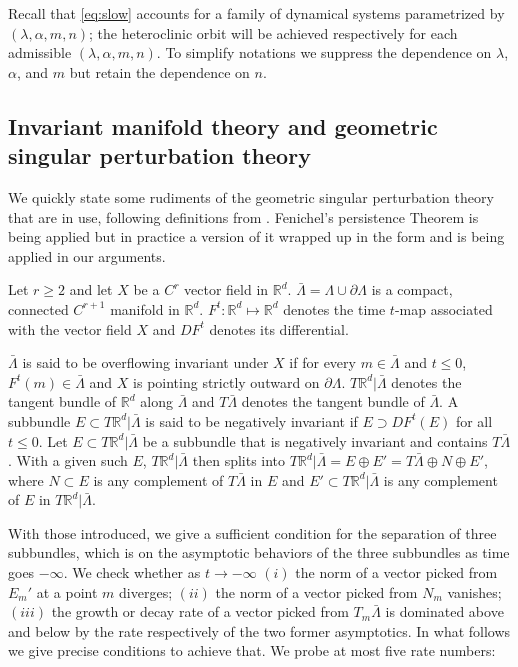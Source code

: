 \documentclass[usletter,11pt]{article}
\theoremstyle{remark}
\begin{document}
Recall that \eqref{eq:slow} accounts for a family of dynamical systems parametrized by $(\lambda,\alpha,m,n)$; the heteroclinic orbit will be achieved respectively for each admissible $(\lambda,\alpha,m,n)$. To simplify notations we suppress the dependence on $\lambda$, $\alpha$, and $m$ but retain
the dependence on $n$.

\subsection{Invariant manifold theory and geometric singular perturbation theory}\label{sec:singpert}
We quickly state some rudiments of the geometric singular perturbation theory that are in use, following definitions from \cite{fenichel_asymptotic_1977,fenichel_geometric_1979}. %
Fenichel's persistence Theorem \cite[Theorem 9.1]{fenichel_geometric_1979} is being applied but in practice a version of it wrapped up in the form \cite[Theorem 2.2]{Sz1991} and \cite[Theorem 3.1]{Sz1991} is being applied in our arguments. 

Let $r\ge2$ and let $X$ be a $C^{r}$ vector field in $\mathbb{R}^d$. $\bar{\Lambda}=\Lambda \cup \partial \Lambda$ is a compact, connected $C^{r+1}$ manifold in $\mathbb{R}^d$. $F^t: \mathbb{R}^d \mapsto \mathbb{R}^d$ denotes the time $t$-map associated with the vector field $X$ and $DF^t$ denotes its differential. 

$\bar{\Lambda}$ is said to be overflowing invariant under $X$ if for every $m\in\bar{\Lambda}$ and $t\le0$, $F^t(m)\in \bar{\Lambda}$ and $X$ is pointing strictly outward on $\partial \Lambda$. $T \mathbb{R}^d|\bar\Lambda$ denotes the tangent bundle of $\mathbb{R}^d$ along $\bar\Lambda$ and $T\bar\Lambda$ denotes the tangent bundle of $\bar\Lambda$. A subbundle $E\subset T\mathbb{R}^d|\bar{\Lambda}$ is said to be negatively invariant if $E \supset DF^t(E)$ for all $t\le0$. Let $E\subset T\mathbb{R}^d|\bar{\Lambda}$ be a subbundle that is negatively invariant and contains $T\bar\Lambda$. With a given such $E$,  $T \mathbb{R}^d| \bar\Lambda$ then splits into $T\mathbb{R}^d|\bar{\Lambda} =E\oplus E'= T\bar\Lambda\oplus N\oplus E'$, where $N\subset E$ is any complement of $T\bar\Lambda$ in $E$ and $E'\subset T\mathbb{R}^d|\bar{\Lambda}$ is any complement of $E$ in $T\mathbb{R}^d|\bar{\Lambda}$.  

With those introduced, we give a sufficient condition for the separation of three subbundles, which is on the asymptotic behaviors of the three subbundles as time goes $-\infty$. We check whether as $t \rightarrow -\infty$ $(i)$ the norm of a vector picked from $E_m'$ at a point $m$ diverges; $(ii)$ the norm of a vector picked from $N_m$ vanishes; $(iii)$ the growth or decay rate of a vector picked from $T_m\bar\Lambda$ is dominated above and below by the rate respectively of the two former asymptotics. In what follows we give precise conditions to achieve that. We probe at most five rate numbers: 
\end{document}
